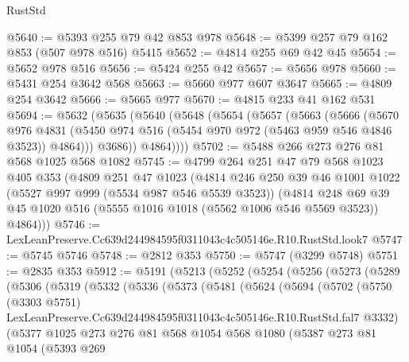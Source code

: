 \begin{lexlean}{RustStd}
\begin{coremodule}
@5640 := @5393 @255 @79 @42 @853 @978
@5648 := @5399 @257 @79 @162 @853 (@507 @978 @516) @5415
@5652 := @4814 @255 @69 @42 @45
@5654 := @5652 @978 @516
@5656 := @5424 @255 @42
@5657 := @5656 @978
@5660 := @5431 @254 @3642 @568
@5663 := @5660 @977 @607 @3647
@5665 := @4809 @254 @3642
@5666 := @5665 @977
@5670 := @4815 @233 @41 @162 @531
@5694 := @5632
    (@5635
      (@5640
        (@5648
          (@5654
            (@5657
              (@5663
                (@5666
                  (@5670
                    @976
                    @4831
                    (@5450 @974 @516 (@5454 @970 @972 (@5463 @959 @546 @4846 @3523)) @4864)))
                @3686))
            @4864))))
@5702 := @5488 @266 @273 @276 @81 @568 @1025 @568 @1082
@5745 := @4799
    @264
    @251
    @47
    @79
    @568
    @1023
    @405
    @353
    (@4809
      @251
      @47
      @1023
      (@4814
        @246
        @250
        @39
        @46
        @1001
        @1022
        (@5527 @997 @999 (@5534 @987 @546 @5539 @3523))
        (@4814
          @248
          @69
          @39
          @45
          @1020
          @516
          (@5555 @1016 @1018 (@5562 @1006 @546 @5569 @3523))
          @4864)))
@5746 := LexLeanPreserve.Cc639d244984595f0311043c4c505146e.R10.RustStd.look7
@5747 := @5745 @5746
@5748 := @2812 @353
@5750 := @5747 (@3299 @5748)
@5751 := @2835 @353
@5912 := @5191
    (@5213
      (@5252
        (@5254
          (@5256
            (@5273
              (@5289
                (@5306
                  (@5319
                    (@5332
                      (@5336
                        (@5373
                          (@5481
                            (@5624
                              (@5694
                                (@5702
                                  (@5750
                                    (@3303 @5751)
                                    LexLeanPreserve.Cc639d244984595f0311043c4c505146e.R10.RustStd.fal7
                                    @3332)
                                  (@5377
                                    @1025
                                    @273
                                    @276
                                    @81
                                    @568
                                    @1054
                                    @568
                                    @1080
                                    (@5387
                                      @273
                                      @81
                                      @1054
                                      (@5393
                                        @269

\end{coremodule}
\end{lexlean}
